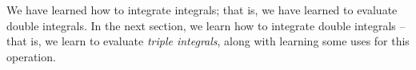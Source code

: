 We have learned how to integrate integrals; that is, we have learned to evaluate double integrals. In the next section, we learn how to integrate double integrals -- that is, we learn to evaluate \emph{triple integrals}, along with learning some uses for this operation.

